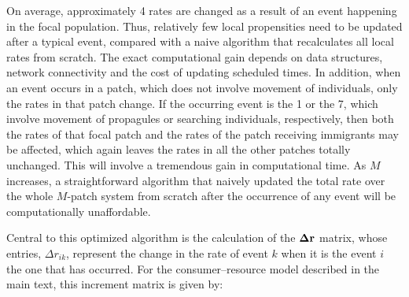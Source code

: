 On average, approximately 4 rates are changed as a result of an event happening in the focal population. Thus, relatively few local propensities need to be updated after a typical event, compared with a naive algorithm that recalculates all local rates from scratch. The exact computational gain depends on data structures, network connectivity and the cost of updating scheduled times. In addition, when an event occurs in a patch, which does not involve movement of individuals, only the rates in that patch change. If the occurring event is the 1 or the 7, which involve movement of propagules or searching individuals, respectively, then both the rates of that focal patch and the rates of the patch receiving immigrants may be affected, which again leaves the rates in all the other patches totally unchanged. This will involve a tremendous gain in computational time. As $M$ increases, a straightforward algorithm that naively updated the total rate over the whole $M$-patch system from scratch after the occurrence of any event will be computationally unaffordable.   

Central to this optimized algorithm is the calculation of the ${\bf \Delta r}$ matrix, whose entries, $\Delta r_{ik}$, represent the change in the rate of event $k$ when it is the event $i$ the one that has occurred. For the consumer--resource model described in the main text, this increment matrix is given by: 
  
